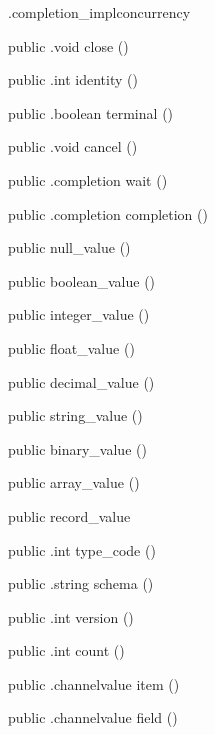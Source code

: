 \begin{CrexxClass}{.completion\_impl}{concurrency}
\begin{Members}
    \Method
      {public}
      {.void}
      {close}
      {()}

    \Method
      {public}
      {.int}
      {identity}
      {()}

    \Method
      {public}
      {.boolean}
      {terminal}
      {()}

    \Method
      {public}
      {.void}
      {cancel}
      {()}

    \Method
      {public}
      {.completion}
      {wait}
      {()}

    \Method
      {public}
      {.completion}
      {completion}
      {()}

    \Factory
      {public}
      {null\_value}
      {()}

    \Factory
      {public}
      {boolean\_value}
      {()}

    \Factory
      {public}
      {integer\_value}
      {()}

    \Factory
      {public}
      {float\_value}
      {()}

    \Factory
      {public}
      {decimal\_value}
      {()}

    \Factory
      {public}
      {string\_value}
      {()}

    \Factory
      {public}
      {binary\_value}
      {()}

    \Factory
      {public}
      {array\_value}
      {()}

    \Factory
      {public}
      {record\_value}
      {}

    \Method
      {public}
      {.int}
      {type\_code}
      {()}

    \Method
      {public}
      {.string}
      {schema}
      {()}

    \Method
      {public}
      {.int}
      {version}
      {()}

    \Method
      {public}
      {.int}
      {count}
      {()}

    \Method
      {public}
      {.channelvalue}
      {item}
      {()}

    \Method
      {public}
      {.channelvalue}
      {field}
      {()}


\end{Members}
\end{CrexxClass}
